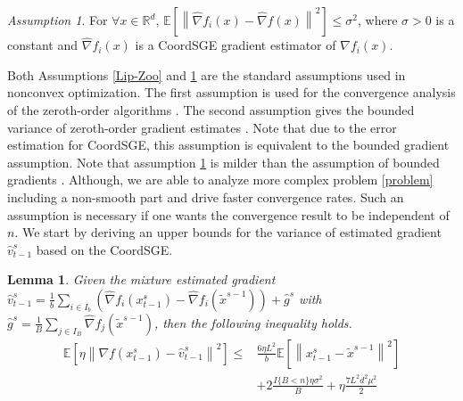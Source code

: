 \documentclass{article}
\newcommand*{\R}{\mathbb{R}}
\newcommand*{\E}{\mathbb{E}}
\newcommand{\norm}[1]{\left\lVert#1\right\rVert}
\newtheorem{lemma}[theorem]{Lemma}
\theoremstyle{definition}
\theoremstyle{remark}
\newtheorem{assumption}[theorem]{Assumption}
\begin{document}
\begin{assumption}\label{Var-Zoo}
For $\forall x\in\R^d$, $\E\left[\norm{\hat{\nabla} f_i(x) - \hat{\nabla} f(x)}^2\right] \leq \sigma^2$, where $\sigma > 0$ is a constant and $\hat{\nabla} f_i(x)$ is a CoordSGE gradient estimator of $\nabla f_i(x)$.
\end{assumption}
{\color{Green}
{\color{Brown}
Both Assumptions \ref{Lip-Zoo} and \ref{Var-Zoo} are the standard assumptions used in nonconvex optimization.}
The first assumption is used for the convergence analysis of the zeroth-order algorithms \cite{ghadimi2016accelerated,nesterov2017random,
liu2018zeroth}.} {\color{Green} The second assumption gives the bounded variance of zeroth-order gradient estimates \cite{lian2016comprehensive,liu2018stochastic,
liu2018zeroth,hajinezhad2017zeroth}. Note that due to the error estimation for CoordSGE, this assumption is equivalent to the bounded gradient assumption. {\color{Brown}
 Note that assumption \ref{Var-Zoo} is milder than the assumption of bounded gradients \cite{liu2017zeroth,hajinezhad2017zeroth}.}
{\color{Green}Although, we are able to analyze more complex problem \eqref{problem} including a non-smooth part and drive faster convergence rates.} {\color{Violet}Such an assumption is necessary if one wants the convergence result to be independent of $n$.
}
{\color{Green}
We start by deriving an upper bounds for the variance of estimated gradient $\hat{v}_{t-1}^s$ based on the CoordSGE.}
}
\begin{lemma}\label{var-estimate-lem}
Given the mixture estimated gradient $\hat{v}_{t-1}^s = \frac{1}{b} \sum_{i\in I_b}\left(\hat{\nabla} f_{i}(x_{t-1}^s)-\hat{\nabla} f_{i}(\tilde{x}^{s-1})\right)+\hat{g}^s$ with $\hat{g}^s = \frac{1}{B} \sum_{j\in I_B} \hat{\nabla} f_j (\tilde{x}^{s-1})$, then the following inequality holds. 
\begin{equation}
\begin{split}
\E\left[\eta\norm{\nabla f(x_{t-1}^s)-{\hat{v}_{t-1}^s}}^2\right] \leq&  \frac{6\eta L^2}{b}\E\left[\norm{x_{t-1}^s-\tilde{x}^{s-1}}^2\right]\\
&+ 2\frac{I\{B < n\}\eta \sigma ^2}{B}+\eta \frac{7 L^2 d^2 \mu^2}{2}
\end{split}
\end{equation}
\end{lemma}
\end{document}
